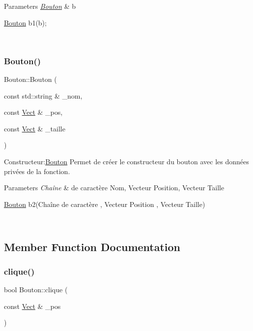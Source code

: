 \begin{DoxyParams}{Parameters}
{\em \hyperlink{classBouton}{Bouton}} & b 
\begin{DoxyCode}
\hyperlink{classBouton}{Bouton} b1(b);
\end{DoxyCode}
 \\
\hline
\end{DoxyParams}
\mbox{\label{classBouton_aeb26a7a212241ab7ce4de225e72c856d}} 
\subsubsection{\texorpdfstring{Bouton()}{Bouton()}\hspace{0.1cm}{\footnotesize\ttfamily [3/3]}}
{\footnotesize\ttfamily Bouton\+::\+Bouton (\begin{DoxyParamCaption}\item[{const std\+::string \&}]{\+\_\+nom,  }\item[{const \hyperlink{classVect}{Vect} \&}]{\+\_\+pos,  }\item[{const \hyperlink{classVect}{Vect} \&}]{\+\_\+taille }\end{DoxyParamCaption})}



Constructeur\+:\hyperlink{classBouton}{Bouton} Permet de créer le constructeur du bouton avec les données privées de la fonction. 


\begin{DoxyParams}{Parameters}
{\em Chaîne} & de caractère Nom, Vecteur Position, Vecteur Taille 
\begin{DoxyCode}
\hyperlink{classBouton}{Bouton} b2(Chaîne de caractère , Vecteur Position , Vecteur Taille)
\end{DoxyCode}
 \\
\hline
\end{DoxyParams}


\subsection{Member Function Documentation}
\mbox{\label{classBouton_a3a5187a073d75fb8afc44704908d5117}} 
\subsubsection{\texorpdfstring{clique()}{clique()}}
{\footnotesize\ttfamily bool Bouton\+::clique (\begin{DoxyParamCaption}\item[{const \hyperlink{classVect}{Vect} \&}]{\+\_\+pos }\end{DoxyParamCaption})}



